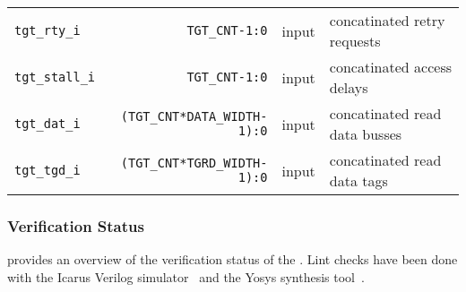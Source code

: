 \begin{center}
\begin{longtable}{|l|r|l|l|}
    \texttt{tgt\_rty\_i}         & \texttt{TGT\_CNT-1:0}               & input  & concatinated retry requests	      \\*
    \texttt{tgt\_stall\_i}       & \texttt{TGT\_CNT-1:0}               & input  & concatinated access delays	      \\*
    \texttt{tgt\_dat\_i}         & \texttt{(TGT\_CNT*DATA\_WIDTH-1):0} & input  & concatinated read data busses	      \\*
    \texttt{tgt\_tgd\_i}         & \texttt{(TGT\_CNT*TGRD\_WIDTH-1):0} & input  & concatinated read data tags         \\   
  \end{longtable}
\end{center}  

\subsubsection{Verification Status}
\label{xbar:verif}

 provides an overview of the verification status of the .
Lint checks have been done with the Icarus Verilog simulator~\cite{iverilog} and the Yosys synthesis tool~\cite{yosys}.


